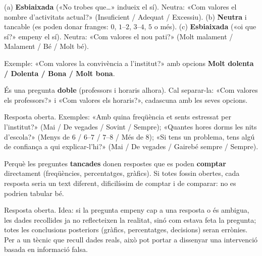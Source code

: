 \begin{solucions}
\begin{sollist}
  \item (a) \textbf{Esbiaixada} («No trobes que\dots» indueix el sí). Neutra: «Com
        valores el nombre d'activitats actual?» (Insuficient / Adequat / Excessiu).
        \quad (b) \textbf{Neutra} i tancable (es poden donar franges: $0$, $1$–$2$,
        $3$–$4$, $5$ o més). \quad (c) \textbf{Esbiaixada} («oi que sí?» empeny el sí).
        Neutra: «Com valores el nou pati?» (Molt malament / Malament / Bé / Molt bé).
  \item Exemple: «Com valores la convivència a l'institut?» amb opcions \textbf{Molt
        dolenta / Dolenta / Bona / Molt bona}.
  \item És una pregunta \textbf{doble} (professors i horaris alhora). Cal separar-la:
        «Com valores els professors?» i «Com valores els horaris?», cadascuna amb les
        seves opcions.
  \item Resposta oberta. Exemples: «Amb quina freqüència et sents estressat per
        l'institut?» (Mai / De vegades / Sovint / Sempre); «Quantes hores dorms les
        nits d'escola?» (Menys de $6$ / $6$–$7$ / $7$–$8$ / Més de $8$); «Si tens un
        problema, tens algú de confiança a qui explicar-l'hi?» (Mai / De vegades /
        Gairebé sempre / Sempre).
  \item Perquè les preguntes \textbf{tancades} donen respostes que es poden
        \textbf{comptar} directament (freqüències, percentatges, gràfics). Si totes
        fossin obertes, cada resposta seria un text diferent, dificilíssim de comptar i
        de comparar: no es podrien tabular bé.
  \item Resposta oberta. Idea: si la pregunta empeny cap a una resposta o és ambigua,
        les dades recollides ja no reflecteixen la realitat, sinó com estava feta la
        pregunta; totes les conclusions posteriors (gràfics, percentatges, decisions)
        seran errònies. Per a un tècnic que recull dades reals, això pot portar a
        dissenyar una intervenció basada en informació falsa.
\end{sollist}
\end{solucions}
